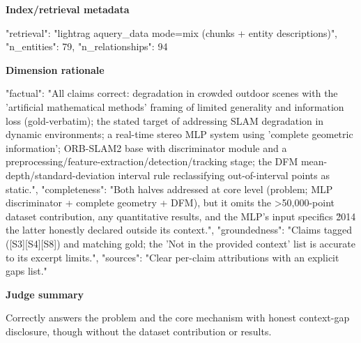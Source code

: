 \documentclass[10pt]{article}
\begin{document}
\textbf{Index/retrieval metadata}
\begin{EvidenceText}
{
  "retrieval": "lightrag aquery_data mode=mix (chunks + entity descriptions)",
  "n_entities": 79,
  "n_relationships": 94
}
\end{EvidenceText}

\textbf{Dimension rationale}
\begin{EvidenceText}
{
  "factual": "All claims correct: degradation in crowded outdoor scenes with the 'artificial mathematical methods' framing of limited generality and information loss (gold-verbatim); the stated target of addressing SLAM degradation in dynamic environments; a real-time stereo MLP system using 'complete geometric information'; ORB-SLAM2 base with discriminator module and a preprocessing/feature-extraction/detection/tracking stage; the DFM mean-depth/standard-deviation interval rule reclassifying out-of-interval points as static.",
  "completeness": "Both halves addressed at core level (problem; MLP discriminator + complete geometry + DFM), but it omits the >50,000-point dataset contribution, any quantitative results, and the MLP's input specifics \u2014 the latter honestly declared outside its context.",
  "groundedness": "Claims tagged ([S3][S4][S8]) and matching gold; the 'Not in the provided context' list is accurate to its excerpt limits.",
  "sources": "Clear per-claim attributions with an explicit gaps list."
}
\end{EvidenceText}

\textbf{Judge summary}
\begin{EvidenceText}
Correctly answers the problem and the core mechanism with honest context-gap disclosure, though without the dataset contribution or results.
\end{EvidenceText}
\end{document}
